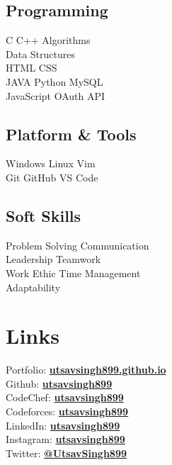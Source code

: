 \documentclass[]{deedy-resume-openfont}
\begin{document}
\begin{minipage}[t]{0.33\textwidth}
\subsection{Programming}
C \textbullet{} C++ \textbullet{} Algorithms \textbullet{} \\
Data Structures \textbullet{} \\
HTML \textbullet{} CSS \\
JAVA \textbullet{} Python \textbullet{} MySQL \textbullet{} \\
JavaScript \textbullet{} OAuth API \\
\sectionsep

\subsection{Platform & Tools}
Windows \textbullet{} Linux \textbullet{} Vim \textbullet{} \\
Git \textbullet{} GitHub \textbullet{} VS Code \\
\sectionsep

\subsection{Soft Skills}
Problem Solving \textbullet{} Communication \textbullet{} \\
Leadership \textbullet{} Teamwork \textbullet{} \\
Work Ethic \textbullet{} Time Management \textbullet{} \\
Adaptability \\
\sectionsep

%
%

\section{Links}
Portfolio: \href{https://utsavsingh899.github.io}{\bf utsavsingh899.github.io} \\
Github: \href{https://github.com/utsavsingh899}{\bf utsavsingh899} \\
CodeChef: \href{https://www.codechef.com/users/utsavsingh899}{\bf utsavsingh899} \\
Codeforces: \href{https://codeforces.com/profile/utsavsingh899}{\bf utsavsingh899} \\
LinkedIn:  \href{https://www.linkedin.com/in/utsavsingh899}{\bf utsavsingh899} \\
Instagram: \href{https://instagram.com/utsavsingh899}{\bf utsavsingh899} \\
Twitter:  \href{https://twitter.com/UtsavSingh899}{\bf @UtsavSingh899} \\
\sectionsep


\end{minipage}
\end{document}
